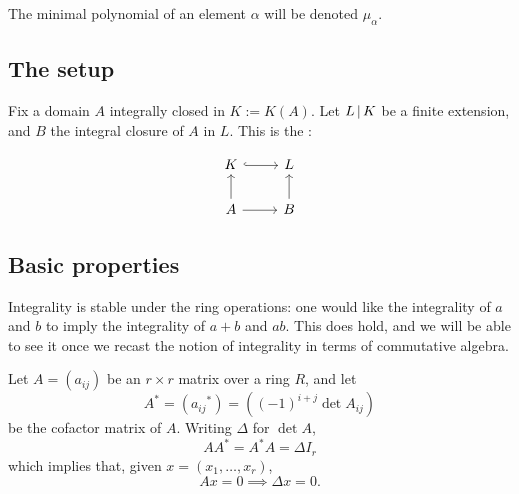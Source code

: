 \begin{definition}
  The minimal polynomial of an element $\alpha$ will be denoted $\mu_\alpha$.
\end{definition}

\subsection{The setup}
Fix a domain $A$ integrally closed in $K := K(A)$. Let $L \mathop{|} K$ be a
finite extension, and $B$ the integral closure of $A$ in $L$. This is the
:

\[
  \begin{tikzcd}
    K \arrow[r, hook] & L \\
    A \arrow[u] \arrow[r] & B \arrow[u]
  \end{tikzcd}
\]

\subsection{Basic properties}

Integrality is stable under the ring operations: one would like the integrality
of $a$ and $b$ to imply the integrality of $a + b$ and $ab$. This does hold,
and we will be able to see it once we recast the notion of integrality in terms
of commutative algebra.

\begin{lemma}
  Let $A = (a_{ij})$ be an $r\times r$ matrix over a ring $R$, and let \[A^\ast
  = ({a_{ij}}^\ast) = ((-1)^{i+j} \det A_{ij})\] be the cofactor matrix of $A$.
  Writing $\Delta$ for $\det A$, \[A{A^\ast} = {A^\ast}A = \Delta I_r \] which
  implies that, given $x = (x_1,\ldots,x_r)$, \[Ax = 0 \implies \Delta x = 0.\]
\end{lemma}

